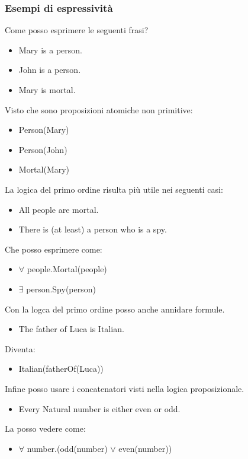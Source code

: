 \documentclass[../main.tex]{subfiles}
\begin{document}
   \subsubsection{Esempi di espressività}
   Come posso esprimere le seguenti frasi?
   \begin{itemize}
      \item Mary is a person.
      \item John is a person.
      \item Mary is mortal.
   \end{itemize}
   Visto che sono proposizioni atomiche non primitive:
   \begin{itemize}
      \item Person(Mary)
      \item Person(John)
      \item Mortal(Mary)
   \end{itemize}
   \vspace{1em}
   La logica del primo ordine risulta più utile nei seguenti casi:
   \begin{itemize}
      \item All people are mortal.
      \item There is (at least) a person who is a spy.
   \end{itemize}
   Che posso esprimere come:
   \begin{itemize}
      \item $\forall$ people.Mortal(people)
      \item $\exists$ person.Spy(person)
   \end{itemize}
   \vspace{1em}
   Con la logca del primo ordine posso anche annidare formule.
   \begin{itemize}
      \item The father of Luca is Italian.
   \end{itemize}
   Diventa:
   \begin{itemize}
      \item Italian(fatherOf(Luca))
   \end{itemize}
   \vspace{1em}
   Infine posso usare i concatenatori visti nella logica proposizionale.
   \begin{itemize}
      \item Every Natural number is either even or odd.
   \end{itemize}
   La posso vedere come:
   \begin{itemize}
      \item $\forall$ number.(odd(number) $\lor$ even(number))
   \end{itemize}
\end{document}
